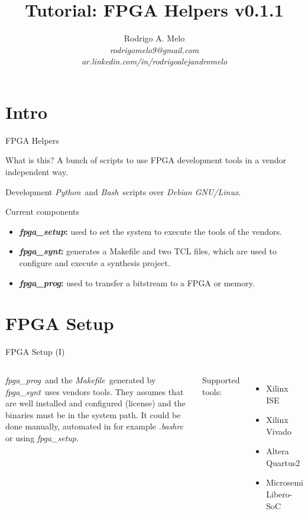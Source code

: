 \documentclass{beamer}
\title[FPGA Helpers]{Tutorial: FPGA Helpers v0.1.1}
\author{
  Rodrigo A. Melo\\
  \textit{rodrigomelo9@gmail.com}\\
  \textit{ar.linkedin.com/in/rodrigoalejandromelo}
}
\newcommand{\python}         {\textit{Python}}
\newcommand{\bash}           {\textit{Bash}}
\newcommand{\debian}         {\textit{Debian GNU/Linux}}
\newcommand{\fpgasetup}      {\textit{fpga\_setup}}
\newcommand{\fpgasynt}       {\textit{fpga\_synt}}
\newcommand{\fpgaprog}       {\textit{fpga\_prog}}
\newcommand{\makefile}       {\textit{Makefile}}
\begin{document}
\begin{frame}
  \titlepage
\end{frame}

\section{Intro}

\begin{frame}{FPGA Helpers}
  \begin{exampleblock}{What is this?}
    A bunch of scripts to use FPGA development tools in a vendor independent way.
  \end{exampleblock}
  \begin{block}{Development}
    \python\ and \bash\ scripts over \debian.
  \end{block}
\end{frame}

\begin{frame}{Current components}
  \begin{itemize}
    \item \textbf{\fpgasetup:} used to set the system to execute the tools of the vendors.
    \item \textbf{\fpgasynt:} generates a Makefile and two TCL files, which are used to
      configure and execute a synthesis project.
    \item \textbf{\fpgaprog:} used to transfer a bitstream to a FPGA or memory.
  \end{itemize}
\end{frame}


\section{FPGA Setup}

\begin{frame}[fragile]{FPGA Setup (I)}
  \begin{columns}
      \begin{block}{}
        \small
        \fpgaprog\ and the \makefile\ generated by \fpgasynt\ uses vendors tools.
        They assumes that are well installed and configured (license) and the
        binaries must be in the system path. It could be done manually,
        automated in for example \textit{.bashrc} or using \fpgasetup.
      \end{block}{}
      \small Supported tools:
      \begin{itemize}
        \tiny
        \item Xilinx ISE
        \item Xilinx Vivado
        \item Altera Quartus2
        \item Microsemi Libero-SoC
      \end{itemize}
  \end{columns}
  \scriptsize
  
\end{frame}
\end{document}
